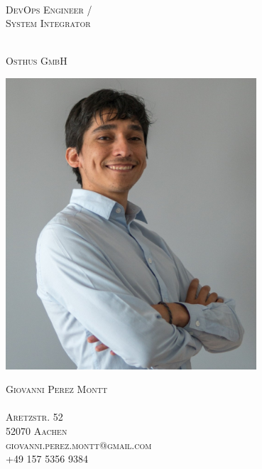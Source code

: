 \documentclass[a4paper,10pt]{article}
\begin{document}

\pagestyle{fancyplain} %
\thispagestyle{empty} %

%
\begin{minipage}[t][5cm][b]{\textwidth}
\begin{center}
\hspace{1cm}\\
\Huge\textsc{DevOps Engineer /}\\
\Huge\textsc{System Integrator}\\
\vspace{0.5 cm}


\hspace{2cm}\\
\huge\textsc{Osthus GmbH}\\
\end{center}
\end{minipage}

\vfill
\begin{center}
\includegraphics[width=0.7\textwidth]{pics/profilegio3.jpeg}
\end{center}
\vfill

\begin{minipage}[b][5cm][t]{\textwidth}
\centering\Large
\textsc{\faUser Giovanni Perez Montt}\\
\textsc{ }\\
\vspace{0.5cm}
\textsc{\faMapMarker Aretzstr.  52  \\ 52070 Aachen}\\
\textsc{\faEnvelope giovanni.perez.montt@gmail.com}\\
\textsc{\faPhone +49 157 5356 9384 }
\end{minipage}
\end{document}
